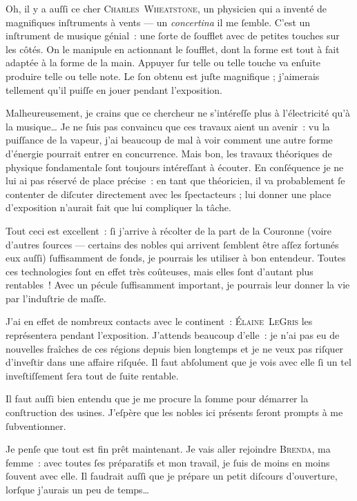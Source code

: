 {Oh, il y a auſſi ce cher \textsc{Charles~Wheatſtone}, un physicien qui a inventé de magnifiques inſtruments à vents — un \textit{concertina} il me ſemble.
C’est un inſtrument de musique génial~:  une ſorte de ſoufflet avec de petites touches sur les côtés.
On le manipule en actionnant le ſoufflet, dont la forme est tout à fait adaptée à la forme de la main.
Appuyer ſur telle ou telle touche va enſuite produire telle ou telle note.
Le ſon obtenu est juſte magnifique ; j’aimerais tellement qu’il puiſſe en jouer pendant l’exposition.

Malheureusement, je crains que ce chercheur ne s’intéreſſe plus à l’électricité qu’à la musique…
Je ne ſuis pas convaincu que ces travaux aient un avenir~:  vu la puiſſance de la vapeur, j’ai beaucoup de mal à voir comment une autre forme d’énergie pourrait entrer en concurrence.
Mais bon, les travaux théoriques de physique fondamentale ſont toujours intéreſſant à écouter.
En conſéquence je ne lui ai pas réservé de place précise~:  en tant que théoricien, il va probablement ſe contenter de diſcuter directement avec les ſpectacteurs ; lui donner une place d’exposition n’aurait fait que lui compliquer la tâche.

Tout ceci est excellent~:  ſi j’arrive à récolter de la part de la Couronne (voire d’autres ſources — certains des nobles qui arrivent ſemblent être aſſez fortunés eux auſſi) ſuffisamment de fonds, je pourrais les utiliser à bon entendeur.
Toutes ces technologies ſont en effet très coûteuses, mais elles ſont d’autant plus rentables~!
Avec un pécule ſuffisamment important, je pourrais leur donner la vie par l’induſtrie de maſſe.

J’ai en effet de nombreux contacts avec le continent~:  \textsc{Élaine~LeGris} les représentera pendant l’exposition.
J’attends beaucoup d’elle~:  je n’ai pas eu de nouvelles fraîches de ces régions depuis bien longtemps et je ne veux pas riſquer d’inveſtir dans une affaire riſquée.
Il faut abſolument que je vois avec elle ſi un tel inveſtiſſement ſera tout de ſuite rentable.

Il faut auſſi bien entendu que je me procure la ſomme pour démarrer la conſtruction des usines.
J’eſpère que les nobles ici présents ſeront prompts à me ſubventionner.

Je penſe que tout est fin prêt maintenant.
Je vais aller rejoindre \textsc{Brenda}, ma femme~:  avec toutes ſes préparatifs et mon travail, je ſuis de moins en moins ſouvent avec elle.
Il faudrait auſſi que je prépare un petit diſcours d’ouverture, lorſque j’aurais un peu de temps…

}

